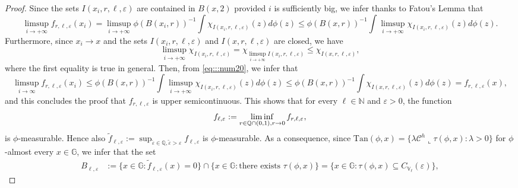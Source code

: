 \documentclass[10pt, a4paper,
oneside, headinclude,footinclude]{scrartcl}
\begin{document}
\begin{proof}
Since the sets $I(x_i,r,\ell,\varepsilon)$ are contained in $B(x,2)$ provided $i$ is sufficiently big, we infer thanks to Fatou's Lemma that
\begin{equation}
\limsup_{i\to+\infty}f_{r,\ell,\varepsilon}(x_i)=\limsup_{i\to+\infty}\phi(B(x_i,r))^{-1}\int \chi_{I(x_i,r,\ell,\varepsilon)}(z)d\phi(z)\leq \phi(B(x,r))^{-1}\int\limsup_{i\to+\infty} \chi_{I(x_i,r,\ell,\varepsilon)}(z)d\phi(z).
\label{eq:::num20}
\end{equation}
Furthermore, since $x_i\to x$ and the sets $I(x_i,r,\ell,\varepsilon)$ and $I(x,r,\ell,\varepsilon)$ are closed, we have
$$\limsup_{i\to+\infty} \chi_{I(x_i,r,\ell,\varepsilon)}=\chi_{\limsup_{i\to+\infty} I (x_i,r,\ell,\varepsilon)}\leq \chi_{I(x,r,\ell,\varepsilon)},
$$ 
where the first equality is true in general. Then, from \eqref{eq:::num20}, we infer that
\begin{equation}
\limsup_{i\to\infty}f_{r,\ell,\varepsilon}(x_i)\leq \phi(B(x,r))^{-1}\int\limsup_{i\to+\infty} \chi_{I(x_i,r,\ell,\varepsilon)}(z)d\phi(z)\leq \phi(B(x,r))^{-1}\int \chi_{I(x,r,\ell,\varepsilon)}(z)d\phi(z)=f_{r,\ell,\varepsilon}(x),
\nonumber
\end{equation}
and this concludes the proof that $f_{r,\ell,\varepsilon}$ is upper semicontinuous. This shows that for every $\ell\in\mathbb N$ and $\varepsilon>0$, the function
$$
f_{\ell,\varepsilon}:=\liminf_{r\in\mathbb{Q}\cap(0,1),r\to 0} f_{r,\ell,\varepsilon},
$$ 
is $\phi$-measurable. Hence also $\widetilde f_{\ell,\varepsilon}:=\sup_{\widetilde{\varepsilon}\in\mathbb Q,\widetilde{\varepsilon}>\varepsilon}f_{\ell,\varepsilon}$ is $\phi$-measurable. As a consequence, since $\mathrm{Tan}(\phi,x)= \{\lambda\mathcal{C}^h\llcorner \tau(\phi,x):\lambda>0\}$ for $\phi$-almost every $x\in\mathbb{G}$, we infer that the set
\begin{equation}\label{eqn:FIRSTINCLUSION}
\begin{split}
     B_{\ell,\varepsilon}&:=\big\{x\in\mathbb{G}:\widetilde f_{\ell,\varepsilon}(x)=0\}\cap \{x\in \mathbb{G}: \text{there exists $\tau(\phi,x)$}\big\}=\{x\in \mathbb{G}:\tau(\phi,x) \subseteq C_{\mathbb V_\ell}(\varepsilon)\},
\end{split}
\end{equation}

\end{proof}
\end{document}
